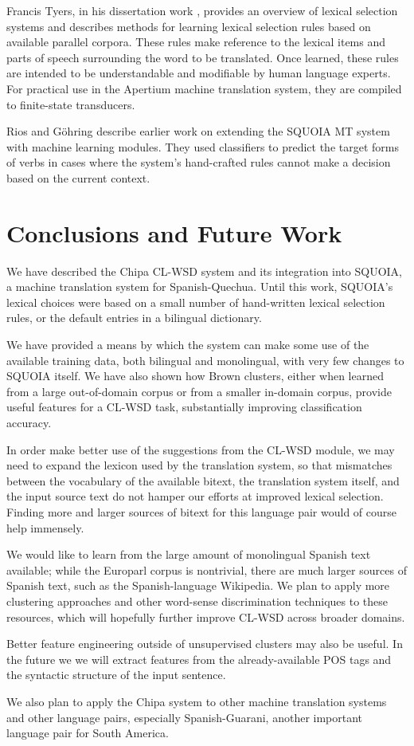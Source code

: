 Francis Tyers, in his dissertation work \cite{tyers-dissertation},
provides an overview of lexical selection systems and describes methods for
learning lexical selection rules based on available parallel corpora. These
rules make reference to the lexical items and parts of speech surrounding the
word to be translated. Once learned, these rules are intended to be
understandable and modifiable by human language experts. For practical use in
the Apertium machine translation system, they are compiled to finite-state
transducers.

Rios and G\"{o}hring \cite{riosgonzales-gohring:2013:HyTra} describe
earlier work on extending the SQUOIA MT system with machine learning modules.
They used classifiers to predict the target forms of verbs in cases where the
system's hand-crafted rules cannot make a decision based on the current
context.

\section{Conclusions and Future Work}
We have described the Chipa CL-WSD system and its integration into SQUOIA,
a machine translation system for Spanish-Quechua.
Until this work, SQUOIA's lexical choices were based on a small number of
hand-written lexical selection rules, or the default entries in a bilingual
dictionary. 

We have provided a means by which the system can make some use of
the available training data, both bilingual and monolingual, with very few
changes to SQUOIA itself. We have also shown how Brown clusters, either when
learned from a large out-of-domain corpus or from a smaller in-domain corpus,
provide useful features for a CL-WSD task, substantially improving
classification accuracy.

In order make better use of the suggestions from the CL-WSD module, we may
need to expand the lexicon used by the translation system, so that mismatches
between the vocabulary of the available bitext, the translation system itself,
and the input source text do not hamper our efforts at improved lexical
selection. Finding more and larger sources of bitext for this language pair
would of course help immensely.

We would like to learn from the large amount of monolingual Spanish text
available; while the Europarl corpus is nontrivial, there are much larger
sources of Spanish text, such as the Spanish-language Wikipedia. We plan
to apply more clustering approaches and other word-sense discrimination
techniques to these resources, which will hopefully further improve CL-WSD
across broader domains.

Better feature engineering outside of unsupervised clusters may also be useful.
In the future we we will extract features from the already-available POS tags
and the syntactic structure of the input sentence.

We also plan to apply the Chipa system to other machine translation systems and
other language pairs, especially Spanish-Guarani, another important language
pair for South America.
